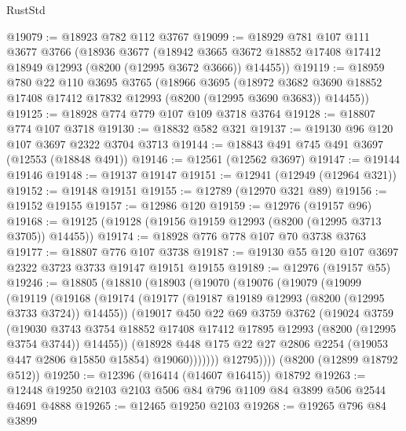 \begin{lexlean}{RustStd}
\begin{coremodule}
@19079 := @18923 @782 @112 @3767
@19099 := @18929
    @781
    @107
    @111
    @3677
    @3766
    (@18936
      @3677
      (@18942 @3665 @3672 @18852 @17408 @17412 @18949 @12993 (@8200 (@12995 @3672 @3666)) @14455))
@19119 := @18959
    @780
    @22
    @110
    @3695
    @3765
    (@18966
      @3695
      (@18972 @3682 @3690 @18852 @17408 @17412 @17832 @12993 (@8200 (@12995 @3690 @3683)) @14455))
@19125 := @18928 @774 @779 @107 @109 @3718 @3764
@19128 := @18807 @774 @107 @3718
@19130 := @18832 @582 @321
@19137 := @19130 @96 @120 @107 @3697 @2322 @3704 @3713
@19144 := @18843 @491 @745 @491 @3697 (@12553 (@18848 @491))
@19146 := @12561 (@12562 @3697)
@19147 := @19144 @19146
@19148 := @19137 @19147
@19151 := @12941 (@12949 (@12964 @321))
@19152 := @19148 @19151
@19155 := @12789 (@12970 @321 @89)
@19156 := @19152 @19155
@19157 := @12986 @120
@19159 := @12976 (@19157 @96)
@19168 := @19125 (@19128 (@19156 @19159 @12993 (@8200 (@12995 @3713 @3705)) @14455))
@19174 := @18928 @776 @778 @107 @70 @3738 @3763
@19177 := @18807 @776 @107 @3738
@19187 := @19130 @55 @120 @107 @3697 @2322 @3723 @3733 @19147 @19151 @19155
@19189 := @12976 (@19157 @55)
@19246 := @18805
    (@18810
      (@18903
        (@19070
          (@19076
            (@19079
              (@19099
                (@19119
                  (@19168
                    (@19174
                      (@19177 (@19187 @19189 @12993 (@8200 (@12995 @3733 @3724)) @14455))
                      (@19017
                        @450
                        @22
                        @69
                        @3759
                        @3762
                        (@19024
                          @3759
                          (@19030
                            @3743
                            @3754
                            @18852
                            @17408
                            @17412
                            @17895
                            @12993
                            (@8200 (@12995 @3754 @3744))
                            @14455))
                        (@18928
                          @448
                          @175
                          @22
                          @27
                          @2806
                          @2254
                          (@19053 @447 @2806 @15850 @15854)
                          @19060)))))))
            @12795))))
    (@8200 (@12899 @18792 @512))
@19250 := @12396 (@16414 (@14607 @16415)) @18792
@19263 := @12448 @19250 @2103 @2103 @506 @84 @796 @1109 @84 @3899 @506 @2544 @4691 @4888
@19265 := @12465 @19250 @2103
@19268 := @19265 @796 @84 @3899

\end{coremodule}
\end{lexlean}
